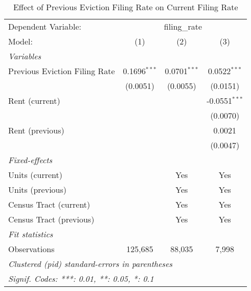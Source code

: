\begin{table}[htbp]
   \caption{\label{tab:evict_persist} Effect of Previous Eviction Filing Rate on Current Filing Rate}
   \centering
   \begin{tabular}{lccc}
      \tabularnewline \midrule \midrule
      Dependent Variable: & \multicolumn{3}{c}{filing\_rate}\\
      Model:                        & (1)            & (2)            & (3)\\  
      \midrule
      \emph{Variables}\\
      Previous Eviction Filing Rate & 0.1696$^{***}$ & 0.0701$^{***}$ & 0.0522$^{***}$\\   
                                    & (0.0051)       & (0.0055)       & (0.0151)\\   
      Rent (current)                &                &                & -0.0551$^{***}$\\   
                                    &                &                & (0.0070)\\   
      Rent (previous)               &                &                & 0.0021\\   
                                    &                &                & (0.0047)\\   
      \midrule
      \emph{Fixed-effects}\\
      Units (current)               &                & Yes            & Yes\\  
      Units (previous)              &                & Yes            & Yes\\  
      Census Tract (current)        &                & Yes            & Yes\\  
      Census Tract (previous)       &                & Yes            & Yes\\  
      \midrule
      \emph{Fit statistics}\\
      Observations                  & 125,685        & 88,035         & 7,998\\  
      \midrule \midrule
      \multicolumn{4}{l}{\emph{Clustered (pid) standard-errors in parentheses}}\\
      \multicolumn{4}{l}{\emph{Signif. Codes: ***: 0.01, **: 0.05, *: 0.1}}\\
   \end{tabular}
\end{table}
